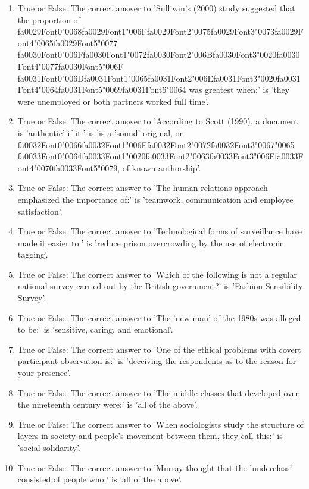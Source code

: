 \documentclass[12pt]{article}
\begin{document}
\begin{enumerate}[label=\arabic*.]
\item True or False: The correct answer to 'Sullivan's (2000) study suggested that the proportion of {\csname fa0029Font0\endcsname\char"0068}{\csname fa0029Font1\endcsname\char"006F}{\csname fa0029Font2\endcsname\char"0075}{\csname fa0029Font3\endcsname\char"0073}{\csname fa0029Font4\endcsname\char"0065}{\csname fa0029Font5\endcsname\char"0077} {\csname fa0030Font0\endcsname\char"006F}{\csname fa0030Font1\endcsname\char"0072}{\csname fa0030Font2\endcsname\char"006B}{\csname fa0030Font3\endcsname\char"0020}{\csname fa0030Font4\endcsname\char"0077}{\csname fa0030Font5\endcsname\char"006F} {\csname fa0031Font0\endcsname\char"006D}{\csname fa0031Font1\endcsname\char"0065}{\csname fa0031Font2\endcsname\char"006E}{\csname fa0031Font3\endcsname\char"0020}{\csname fa0031Font4\endcsname\char"0064}{\csname fa0031Font5\endcsname\char"0069}{\csname fa0031Font6\endcsname\char"0064} was greatest when:' is 'they were unemployed or both partners worked full time'.
\item True or False: The correct answer to 'According to Scott (1990), a document is 'authentic' if it:' is 'is a 'sound' original, or {\csname fa0032Font0\endcsname\char"0066}{\csname fa0032Font1\endcsname\char"006F}{\csname fa0032Font2\endcsname\char"0072}{\csname fa0032Font3\endcsname\char"0067}{\char"0065} {\csname fa0033Font0\endcsname\char"0064}{\csname fa0033Font1\endcsname\char"0020}{\csname fa0033Font2\endcsname\char"0063}{\csname fa0033Font3\endcsname\char"006F}{\csname fa0033Font4\endcsname\char"0070}{\csname fa0033Font5\endcsname\char"0079}, of known authorship'.
\item True or False: The correct answer to 'The human relations approach emphasized the importance of:' is 'teamwork, communication and employee satisfaction'.
\item True or False: The correct answer to 'Technological forms of surveillance have made it easier to:' is 'reduce prison overcrowding by the use of electronic tagging'.
\item True or False: The correct answer to 'Which of the following is not a regular national survey carried out by the British government?' is 'Fashion Sensibility Survey'.
\item True or False: The correct answer to 'The 'new man' of the 1980s was alleged to be:' is 'sensitive, caring, and emotional'.
\item True or False: The correct answer to 'One of the ethical problems with covert participant observation is:' is 'deceiving the respondents as to the reason for your presence'.
\item True or False: The correct answer to 'The middle classes that developed over the nineteenth century were:' is 'all of the above'.
\item True or False: The correct answer to 'When sociologists study the structure of layers in society and people's movement between them, they call this:' is 'social solidarity'.
\item True or False: The correct answer to 'Murray thought that the 'underclass' consisted of people who:' is 'all of the above'.
\end{enumerate}
\end{document}
